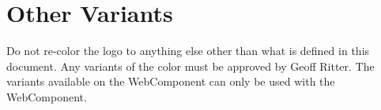 \documentclass{logo_styleguide}
\begin{document}
\logooutlined



\section{Other Variants}
Do not re-color the logo to anything else other than what is defined in this document. Any variants of the color must be
approved by Geoff Ritter. The variants available on the WebComponent can only be used with the WebComponent.
\end{document}
